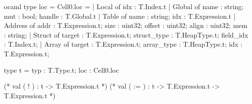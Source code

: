 \begin{cminted}{ocaml}
type loc = Cell0.loc =
| Local of { idx : T.Index.t }
| Global of { name : string; mut : bool; handle : T.Global.t }
| Table of { name : string; idx : T.Expression.t }
| Address of {
    addr : T.Expression.t;
    size : uint32;
    offset : uint32;
    align : uint32;
    mem : string;
  }
| Struct of {
    target : T.Expression.t;
    struct_type : T.HeapType.t;
    field_idx : T.Index.t;
  }
| Array of {
    target : T.Expression.t;
    array_type : T.HeapType.t;
    idx : T.Expression.t;
  }

type t = { typ : T.Type.t; loc : Cell0.loc }


(* val ( ! ) : t -> T.Expression.t *)
(* val ( := ) : t -> T.Expression.t -> T.Expression.t *) 

\end{cminted}